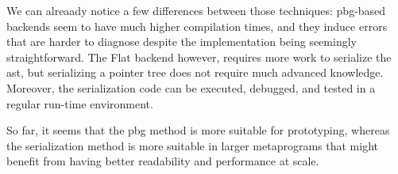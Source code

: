\documentclass[../main]{subfiles}
\begin{document}
We can alreaady notice a few differences between those techniques:
\gls{pbg}-based backends seem to have much higher compilation times,
and they induce errors that are harder to diagnose despite the implementation
being seemingly straightforward.
The Flat backend however, requires more work to serialize the \gls{ast},
but serializing a pointer tree does not require much advanced \cpp knowledge.
Moreover, the serialization code can be executed, debugged, and tested in a
regular run-time environment.

So far, it seems that the \gls{pbg} method is more suitable for prototyping,
whereas the serialization method is more suitable in larger metaprograms that
might benefit from having better readability and performance at scale.
\end{document}
